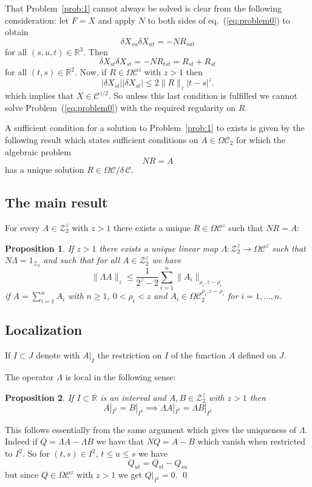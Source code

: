 \documentclass[a4paper,12pt,reqno]{amsproc}
\newcommand{\der}{\delta\!}
\newcommand{\RR}{\mathbb{R}}
\newcommand{\NN}{N}
\newcommand{\CC}{\mathcal{C}}
\newcommand{\ZZ}{\mathcal{Z}}
\newcommand{\OCC}{\Omega \mathcal{C}}
\newtheorem{proposition}{Proposition}
\begin{document}
That Problem~\ref{prob:1} cannot always be solved is clear from the following
consideration: let $F = X$ and apply $\NN$
to both sides of eq.~(\ref{eq:problem0}) to obtain
\begin{equation*}
  \der X_{su} \der X_{ut} =- \NN R_{sut}
\end{equation*}
for all $(s,u,t) \in \RR^3$. Then
\begin{equation*}
  \der X_{st} \der X_{st} =- \NN R_{tst} = R_{st}+R_{st}
\end{equation*}
for all $(t,s) \in \RR^2$. Now, if $R \in \OCC^z$ with $z > 1$ then 
\begin{equation}
\label{eq:counterex0}
  |\der X_{st}| |\der X_{st}| \le 2 \|R\|_z |t-s|^z.
\end{equation}
which implies that $X \in \CC^{z/2}$. So unless this last condition is
fulfilled we cannot solve Problem~(\ref{eq:problem0}) with the
required regularity on $R$.


A sufficient condition for a solution to Problem~\ref{prob:1} to
exists is given by the following result which states sufficient
conditions on $A \in \OCC_2$ for which the algebraic problem
$$
\NN R = A
$$
has a unique solution $R \in \OCC/\der\, \CC$.

\subsection{The main result}
For every $A \in \ZZ_2^z$ with $z > 1$ there exists a unique $R \in
\OCC^z$ such that $\NN R = A$:
\begin{proposition}
\label{prop:main}
If $z > 1$ there exists a unique linear  map $\Lambda:
\ZZ^{z}_2 \to \OCC^z$ such that $N \Lambda  = 1_{\ZZ_2}$ and
 such that for all
$A \in \ZZ^z_2$ we have 
\begin{equation*}
\|\Lambda A\|_{z} \le \frac{1}{2^z-2} \sum_{i=1}^n \|A_i\|_{\rho_i,z-\rho_i}  
\end{equation*}
if
$A = \sum_{i=1}^n A_i $ with
$n \ge 1$, 
$0 < \rho_i < z$ and $A_i \in \OCC_2^{\rho_i,z-\rho_i}$ for
$i=1,\dots,n$. 
\end{proposition}

\subsection{Localization}
If $I \subset J$
denote with $A|_I$ the restriction on $I$ of the function $A$ defined
on $J$.
 
The operator $\Lambda$ is local in the following sense:
\begin{proposition}
\label{prop:local}
If $I \subset \RR$ is an interval and $A,B \in \ZZ_2^z$ with $z > 1$
then
\begin{equation*}
  A |_{I^3} = B |_{I^3} \implies \Lambda A |_{I^2}= \Lambda B|_{I^2}  
\end{equation*}
\end{proposition}
\proof
This follows essentially from the same argument which gives the
uniqueness of $\Lambda$. Indeed if $Q = \Lambda A - \Lambda B$ we have that
$\NN Q = A-B $ which vanish when restricted to $I^2$. So for $(t,s) \in
I^2$, $t \le u \le s$ we have 
$$
Q_{ut}= Q_{st} - Q_{su} 
$$
but since $Q \in \OCC^z$ with $z>1$ we get $Q |_{I^2} = 0$.
\qed
\end{document}
